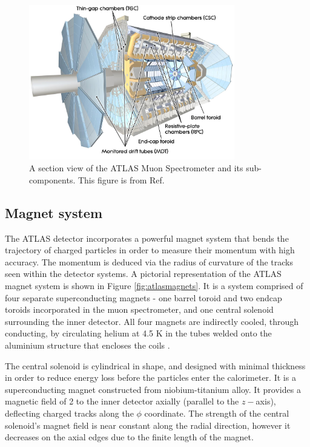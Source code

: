 \begin{figure}
    \centering
    \includegraphics[width=0.8\textwidth]{Figures/LHC/ATLAS_MS.jpeg}
    \caption{A section view of the ATLAS Muon Spectrometer and its sub-components. This figure is from Ref.~\cite{ATLAS_MS}}
    \label{fig:muonspectrometer}
\end{figure}
\subsection{Magnet system}

The ATLAS detector incorporates a powerful magnet system that bends the trajectory of charged particles in order to measure their momentum with high accuracy. The momentum is deduced via the radius of curvature of the tracks seen within the detector systems. A pictorial representation of the ATLAS magnet system is shown in Figure \ref{fig:atlasmagnets}. It is a system comprised of four separate superconducting magnets - one barrel toroid and two endcap toroids incorporated in the muon spectrometer, and one central solenoid surrounding the inner detector. All four magnets are indirectly cooled, through conducting, by circulating helium at 4.5 K in the tubes welded onto the aluminium structure that encloses the coils \cite{828245}. 

The central solenoid is cylindrical in shape, and designed with minimal thickness in order to reduce energy loss before the particles enter the calorimeter. It is a superconducting magnet constructed from niobium-titanium alloy. It provides a magnetic field of \unit{2}{\tesla} to the inner detector axially (parallel to the $z-$axis), deflecting charged tracks along the $\phi$ coordinate. The strength of the central solenoid's magnet field is near constant along the radial direction, however it decreases on the axial edges due to the finite length of the magnet. 

